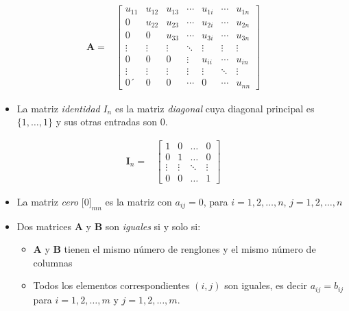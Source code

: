 \documentclass[
]{article}
\providecommand{\tightlist}{%
  \setlength{\itemsep}{0pt}\setlength{\parskip}{0pt}}
\begin{document}
\begin{equation}
\begin{array}{cc}
\mathbf{A}  =&  \begin{bmatrix}
        u_{11}  & u_{12} & u_{13}  & \cdots &  u_{1i}  & \cdots & u_{1n} \\
          0     & u_{22} & u_{23}  & \cdots &  u_{2i}  & \cdots & u_{2n} \\
          0     &   0    & u_{33}  & \cdots &  u_{3i}  & \cdots & u_{3n} \\
        \vdots  & \vdots & \vdots  & \ddots &  \vdots  & \vdots & \vdots \\
          0     &   0    &  0      & \vdots &  u_{ii}  & \cdots & u_{in} \\
        \vdots  & \vdots & \vdots  & \vdots &  \vdots  & \ddots & \vdots \\
          0   ´  &   0    &    0    & \cdots &    0     & \cdots & u_{nn} 
  \end{bmatrix}
\end{array}
\end{equation}

\begin{itemize}
\tightlist
\item
  La matriz \emph{identidad} \(I_n\) es la matriz \emph{diagonal} cuya
  diagonal principal es \(\{1,\ldots,1\}\) y sus otras entradas son
  \(0\).
\end{itemize}

\begin{equation}
\begin{array}{cc}
\mathbf{I}_n  =&  \begin{bmatrix}
        1  & 0  & \ldots   & 0   \\
        0  & 1  & \ldots   & 0 \\
        \vdots  & \vdots   & \ddots   & \vdots \\
        0  & 0  & \ldots   & 1 
  \end{bmatrix}
\end{array}
\end{equation}

\begin{itemize}
\item
  La matriz \emph{cero} \(\Big[0\Big]_{mn}\) es la matriz con
  \(a_{ij}=0\), para \(i=1,2,\ldots,n\), \(j=1,2,\ldots,n\)
\item
  Dos matrices \(\textbf{A}\) y \(\textbf{B}\) son \emph{iguales} si y
  solo si:

  \begin{itemize}
  \tightlist
  \item
    \(\textbf{A}\) y \(\textbf{B}\) tienen el mismo número de renglones
    y el mismo número de columnas
  \item
    Todos los elementos correspondientes \((i,j)\) son iguales, es decir
    \(a_{ij}=b_{ij}\) para \(i=1,2,\ldots,m\) y \(j=1,2,\ldots,m\).
  \end{itemize}
\end{itemize}
\end{document}
